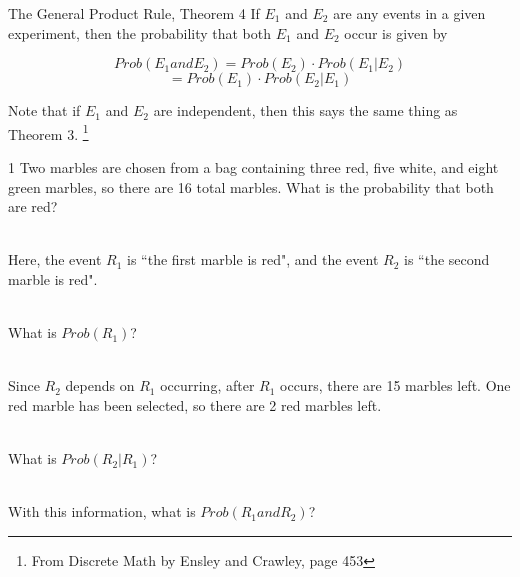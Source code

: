 \documentclass[a4paper,12pt]{book}
\newcounter{question}
\begin{document}
        \newpage

        \begin{intro}{The General Product Rule, Theorem 4}
            If $E_{1}$ and $E_{2}$ are any events in a given experiment, then
            the probability that both $E_{1}$ and $E_{2}$ occur is given by

            $$Prob(E_{1} and E_{2}) = Prob(E_{2}) \cdot Prob(E_{1} | E_{2}) $$
            $$ = Prob(E_{1}) \cdot Prob(E_{2} | E_{1}) $$

            Note that if $E_{1}$ and $E_{2}$ are independent, then this says
            the same thing as Theorem 3.
            \footnote{From Discrete Math by Ensley and Crawley, page 453}
        \end{intro}
        
        \begin{question}{\thequestion}{1}
            Two marbles are chosen from a bag containing three red, five white, and eight green marbles,
            so there are 16 total marbles.
            What is the probability that both are red?

            ~\\
            Here, the event $R_{1}$ is ``the first marble is red",
            and the event $R_{2}$ is ``the second marble is red".

            ~\\
            What is $Prob(R_{1})$?

            ~\\
            Since $R_{2}$ depends on $R_{1}$ occurring, after $R_{1}$
            occurs, there are 15 marbles left. One red marble
            has been selected, so there are 2 red marbles left.

            ~\\
            What is $Prob(R_{2} | R_{1})$?

            ~\\
            With this information, what is $Prob(R_{1} and R_{2})$?
                
 
        \end{question}
\end{document}
